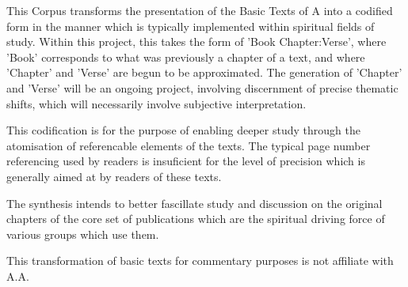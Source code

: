 

\begingroup 
    \fontsize{12pt}{11pt}
    \selectfont

This Corpus transforms the presentation of the Basic Texts of A 
    into a codified form 
    in the manner which is typically implemented 
    within spiritual fields of study.
Within this project, this takes the form of 'Book Chapter:Verse', 
    where 'Book' corresponds to what was previously a chapter of a text, 
    and where 'Chapter' and 'Verse' are begun to be approximated.
The generation of 'Chapter' and 'Verse' will be an ongoing project,
    involving discernment of precise thematic shifts,
    which will necessarily involve subjective interpretation.

This codification is for the purpose of enabling deeper study 
    through the atomisation of referencable elements of the texts. 
The typical page number referencing used by readers 
    is insuficient for the level of precision 
    which is generally aimed at by readers of these texts.

The synthesis intends to better fascillate study and discussion 
    on the original chapters of the core set of publications 
    which are the spiritual driving force of various groups which use them.

This transformation of basic texts for commentary purposes 
    is not affiliate with A.A.

\endgroup
\clearpage
